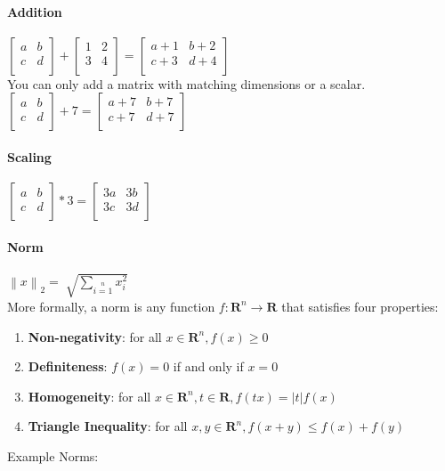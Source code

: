 \documentclass{article}
\newcommand{\norm}[1]{\left\lVert #1 \right\rVert} %
\begin{document}
\paragraph{Addition}
$\begin{bmatrix}
    a & b \\
    c & d \\
\end{bmatrix}
+
\begin{bmatrix}
    1 & 2 \\
    3 & 4 \\
\end{bmatrix}
=
\begin{bmatrix}
    a+1 & b+2 \\
    c+3 & d+4 \\
\end{bmatrix}$ \\
You can only add a matrix with matching dimensions or a scalar. \\
$\begin{bmatrix}
    a & b \\
    c & d \\
\end{bmatrix}
+
7
=
\begin{bmatrix}
    a+7 & b+7 \\
    c+7 & d+7 \\
\end{bmatrix}$
\paragraph{Scaling}
$\begin{bmatrix}
    a & b \\
    c & d \\
\end{bmatrix}
*
3
=
\begin{bmatrix}
    3a & 3b \\
    3c & 3d \\
\end{bmatrix}$
\paragraph{Norm} $\norm{x}_{2} = \sqrt[]{\sum\limits_{i=1}\limits^{n}{x_{i}^{2}}}$ \\
More formally, a norm is any function $f: \mathbf{R}^n \rightarrow \mathbf{R}$ that satisfies four properties:
\begin{enumerate}
  \item \textbf{Non-negativity}: for all $x\in \mathbf{R}^n, f(x) \geq 0$
  \item \textbf{Definiteness}: $f(x) = 0$ if and only if $x=0$
  \item \textbf{Homogeneity}: for all $x\in \mathbf{R}^n, t\in \mathbf{R}, f(tx) = \lvert t\rvert f(x)$
  \item \textbf{Triangle Inequality}: for all $x,y\in \mathbf{R}^n, f(x+y) \leq f(x) + f(y)$
\end{enumerate}
Example Norms:
\end{document}
